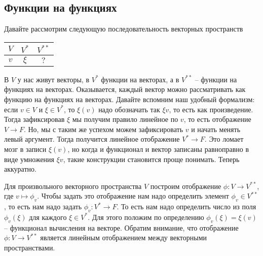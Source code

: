 \subsection{Функции на функциях}

Давайте рассмотрим следующую последовательность векторных пространств
\begin{center}
\begin{tabular}{c|c|c}

{$V$}&{$V^*$}&{$V^{**}$}\\

\hline

{$v$}&{$\xi$}&{$?$}\\

\end{tabular}
\end{center}
В $V$ у нас живут векторы, в $V^*$ функции на векторах, а в $V^{**}$ -- функции на функциях на векторах.
Оказывается, каждый вектор можно рассматривать как функцию на функциях на векторах.
Давайте вспомним наш удобный формализм: если $v\in V$ и $\xi \in V^*$, то $\xi(v)$ надо обозначать так $\xi v$, то есть как произведение.
Тогда зафиксировав $\xi$ мы получим правило линейное по $v$, то есть отображение $V\to F$.
Но, мы с таким же успехом можем зафиксировать $v$ и начать менять левый аргумент.
Тогда получится линейное отображение $V^* \to F$.
Это ломает мозг в записи $\xi(v)$, но когда и функционал и вектор записаны равноправно в виде умножения $\xi v$, такие конструкции становится проще понимать.
Теперь аккуратно.

Для произвольного векторного пространства $V$ построим отображение $\phi\colon V\to V^{**}$, где $v\mapsto \phi_v$.
Чтобы задать это отображение нам надо определить элемент $\phi_v\in V^{**}$, то есть нам надо задать $\phi_v\colon V^*\to F$.
То есть нам надо определить число из поля $\phi_v(\xi)$ для каждого $\xi\in V^*$.
Для этого положим по определению $\phi_v(\xi) = \xi(v)$ -- функционал вычисления на векторе.
Обратим внимание, что отображение $\phi\colon V\to V^{**}$ является линейным отображением между векторными пространствами.


